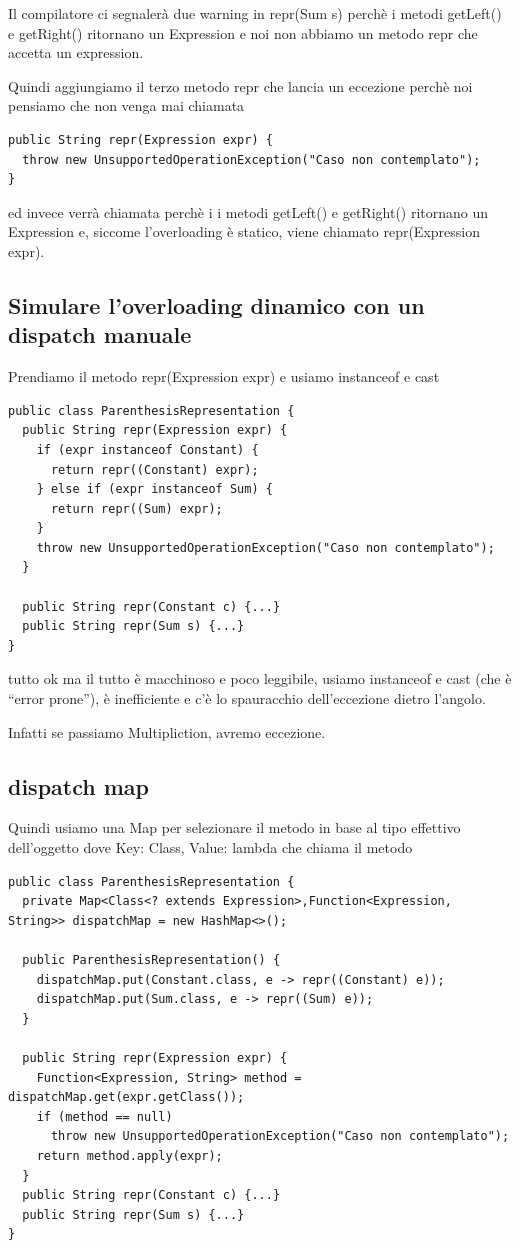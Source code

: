 Il compilatore ci segnalerà due warning in repr(Sum s) perchè i metodi getLeft() e getRight() ritornano un Expression e noi non abbiamo un metodo repr che 
accetta un expression.

Quindi aggiungiamo il terzo metodo repr che lancia un eccezione perchè noi pensiamo che non venga mai chiamata
\begin{lstlisting}
public String repr(Expression expr) {
  throw new UnsupportedOperationException("Caso non contemplato");
}   
\end{lstlisting}

ed invece verrà chiamata perchè i i metodi getLeft() e getRight() ritornano un Expression e, siccome l'overloading è statico, viene chiamato repr(Expression expr).

\subsection{Simulare l’overloading dinamico con un dispatch manuale}

Prendiamo il metodo repr(Expression expr) e usiamo instanceof e cast
\begin{lstlisting}
public class ParenthesisRepresentation {
  public String repr(Expression expr) {
    if (expr instanceof Constant) {
      return repr((Constant) expr);
    } else if (expr instanceof Sum) {
      return repr((Sum) expr);
    }
    throw new UnsupportedOperationException("Caso non contemplato");
  }
  
  public String repr(Constant c) {...}
  public String repr(Sum s) {...}
}
\end{lstlisting}

tutto ok ma il tutto è macchinoso e poco leggibile, usiamo instanceof e cast (che è “error prone”), è inefficiente e c'è lo spauracchio dell'eccezione dietro l'angolo.

Infatti se passiamo Multipliction, avremo eccezione.

\subsection{dispatch map}

Quindi usiamo una Map per selezionare il metodo in base al tipo effettivo dell’oggetto dove Key: Class, Value: lambda che chiama il metodo
\begin{lstlisting}
public class ParenthesisRepresentation {
  private Map<Class<? extends Expression>,Function<Expression, String>> dispatchMap = new HashMap<>();

  public ParenthesisRepresentation() {
    dispatchMap.put(Constant.class, e -> repr((Constant) e));
    dispatchMap.put(Sum.class, e -> repr((Sum) e));
  }

  public String repr(Expression expr) {
    Function<Expression, String> method = dispatchMap.get(expr.getClass());
    if (method == null)
      throw new UnsupportedOperationException("Caso non contemplato");
    return method.apply(expr);
  }
  public String repr(Constant c) {...}
  public String repr(Sum s) {...}
}
\end{lstlisting}

